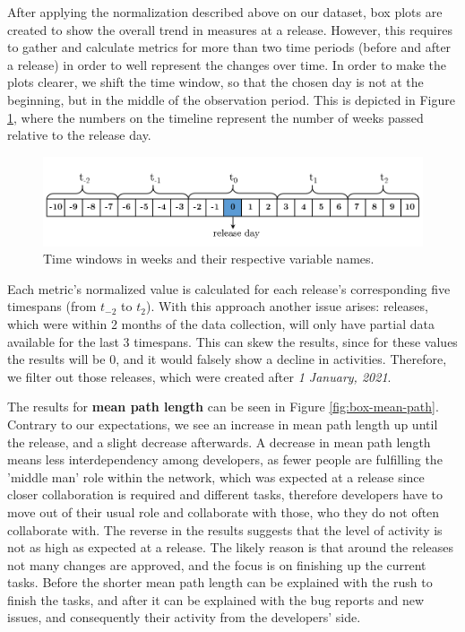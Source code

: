 After applying the normalization described above on our dataset, box plots are created to show the overall trend in measures at a release. However, this requires to gather and calculate metrics for more than two time periods (before and after a release) in order to well represent the changes over time. In order to make the plots clearer, we shift the time window, so that the chosen day is not at the beginning, but in the middle of the observation period. This is depicted in Figure \ref{fig:time-window}, where the numbers on the timeline represent the number of weeks passed relative to the release day.

\begin{figure}
    \centering
    \includegraphics[width=\textwidth]{figures/quantitative/time_window.png}
    \caption{Time windows in weeks and their respective variable names.}
    \label{fig:time-window}
\end{figure}

Each metric's normalized value is calculated for each release's corresponding five timespans (from $t_{-2}$ to $t_2$). With this approach another issue arises: releases, which were within 2 months of the data collection, will only have partial data available for the last 3 timespans. This can skew the results, since for these values the results will be 0, and it would falsely show a decline in activities. Therefore, we filter out those releases, which were created after \textit{1 January, 2021}.

The results for \textbf{mean path length} can be seen in Figure \ref{fig:box-mean-path}. Contrary to our expectations, we see an increase in mean path length up until the release, and a slight decrease afterwards. A decrease in mean path length means less interdependency among developers, as fewer people are fulfilling the 'middle man' role within the network, which was expected at a release since closer collaboration is required and different tasks, therefore developers have to move out of their usual role and collaborate with those, who they do not often collaborate with. The reverse in the results suggests that the level of activity is not as high as expected at a release. The likely reason is that around the releases not many changes are approved, and the focus is on finishing up the current tasks. Before the shorter mean path length can be explained with the rush to finish the tasks, and after it can be explained with the bug reports and new issues, and consequently their activity from the developers' side.

